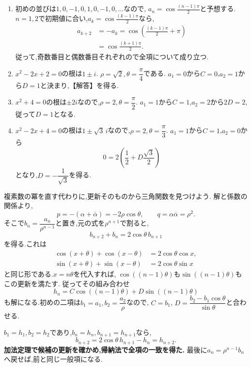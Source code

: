 \noindent{}\par\nobreak
\begin{enumerate}[label=(\arabic*),parsep=3pt,format=\bookitemlink{example-complex-1}{solution}{problem}]
  \item 初めの並びは$1,0,-1,0,1,0,-1,0,\ldots$なので,
    $a_n=\cos\frac{(n-1)\pi}{2}$と予想する.
    $n=1,2$で初期値に合い,$a_k=\cos\frac{(k-1)\pi}{2}$なら,
    \[
      \begin{aligned}
        a_{k+2}&=-a_k=\cos\left(\frac{(k-1)\pi}{2}+\pi\right)\\
        &=\cos\frac{(k+1)\pi}{2}.
      \end{aligned}
    \]
    従って,奇数番目と偶数番目それぞれので全項について成り立つ.
  \item {}$x^2-2x+2=0$の根は$1\pm i$.
    $\rho=\sqrt2,\theta=\dfrac{\pi}{4}$である.
    $a_1=0$から$C=0$,$a_2=1$から$D=1$と決まり,【解答】を得る.
  \item $x^2+4=0$の根は$\pm2i$なので,$\rho=2,\theta=\dfrac{\pi}{2}$.
    $a_1=1$から$C=1$,$a_2=2$から$2D=2$,従って$D=1$となる.
  \item $x^2-2x+4=0$の根は$1\pm\sqrt3\,i$なので,$\rho=2,\theta=\dfrac{\pi}{3}$.
    $a_1=1$から$C=1$,$a_2=0$から
    \[
      0=2\left(\frac12+D\frac{\sqrt3}{2}\right)
    \]
    となり,$D=-\dfrac{1}{\sqrt3}$を得る.
\end{enumerate}

\label{解釈：虚数解と加法定理}
複素数の冪を直す代わりに,更新そのものから三角関数を見つけよう.
解と係数の関係より,
\[
  p=-(\alpha+\overline\alpha)=-2\rho\cos\theta,
  \qquad q=\alpha\overline\alpha=\rho^2.
\]
そこで$b_n=\dfrac{a_n}{\rho^{n-1}}$と置き,元の式を$\rho^{n+1}$で割ると,
\[
  b_{n+2}+b_n=2\cos\theta\,b_{n+1}
\]
を得る.これは
\[
  \begin{aligned}
    \cos(x+\theta)+\cos(x-\theta)&=2\cos\theta\cos x,\\
    \sin(x+\theta)+\sin(x-\theta)&=2\cos\theta\sin x
  \end{aligned}
\]
と同じ形である.$x=n\theta$を代入すれば,
$\cos((n-1)\theta)$も$\sin((n-1)\theta)$もこの更新を満たす.
従ってその組み合わせ
\[
  h_n=C\cos((n-1)\theta)+D\sin((n-1)\theta)
\]
も解になる.初めの二項は$b_1=a_1,b_2=\dfrac{a_2}{\rho}$なので,
$C=b_1$, $D=\dfrac{b_2-b_1\cos\theta}{\sin\theta}$と合わせる.

$b_1=h_1,b_2=h_2$であり,$b_n=h_n,b_{n+1}=h_{n+1}$なら,
\[
  b_{n+2}=2\cos\theta\,h_{n+1}-h_n=h_{n+2}.
\]
\textbf{加法定理で候補の更新を確かめ,帰納法で全項の一致を得た.}
最後に$a_n=\rho^{n-1}b_n$へ戻せば,前と同じ一般項になる.

